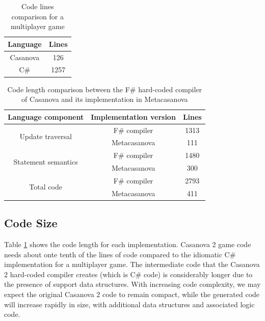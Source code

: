 \begin{table}
\centering
\begin{tabular}{|c|c|}
	\hline
	Language & Lines \\ \hline
	Casanova & 126 \\
	\hline
	C\# &  1257 \\
	\hline
\end{tabular}
\caption{Code lines comparison for a multiplayer game}
\label{tab:ch_networking_length}
\end{table}

\begin{table}
\centering
  \begin{tabular}{|c|c|c|}
    \hline
    Language component & Implementation version & Lines \\
    \hline
    \multirow{2}{*}{Update traversal}
    & F\# compiler & 1313 \\
    & Metacasanova & 111 \\
    \hline
    \multirow{2}{*}{Statement semantics}
    & F\# compiler & 1480 \\
    & Metacasanova & 300 \\
    \hline
    \multirow{2}{*}{Total code}
    & F\# compiler & 2793 \\
    & Metacasanova & 411 \\
    \hline
  \end{tabular}
  \caption{Code length comparison between the F\# hard-coded compiler of Casanova and its implementation in Metacasanova}
  \label{tab:ch_networking_compiler_length}
\end{table}

\subsection{Code Size}
Table \ref{tab:ch_networking_length} shows the code length for each implementation. Casanova 2 game code needs about onte tenth of the lines of code compared to the idiomatic C\# implementation for a multiplayer game. The intermediate code that the Casanova 2 hard-coded compiler creates (which is C\# code) is considerably longer due to the presence of support data structures. With increasing code complexity, we may expect the original Casanova 2 code to remain compact, while the generated code will increase rapidly in size, with additional data structures and associated logic code.

